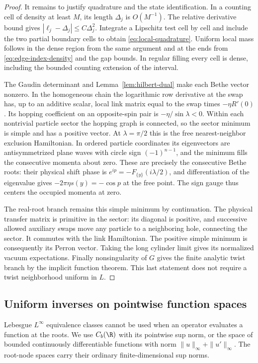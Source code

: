 \begin{proof}
It remains to justify quadrature and the state identification.
In a counting cell of density at least $M$, its length $\Delta_j$
is $O(M^{-1})$.  The relative derivative bound gives
$|\ell_j-\Delta_j|\le C\Delta_j^2$.  Integrate a Lipschitz test
cell by cell and include the two partial boundary cells to obtain
\eqref{eq:local-quadrature}.  Uniform local mass follows in the
dense region from the same argument and at the ends from
\eqref{eq:edge-index-density} and the gap bounds.  In regular
filling every cell is dense, including the bounded counting
extension of the interval.

The Gaudin determinant and Lemma~\ref{lem:hilbert-dual} make
each Bethe vector nonzero.  In the homogeneous chain the logarithmic
row derivative at the swap has, up to an additive scalar, local
link matrix equal to the swap times $-\eta R'(0)$.  Its hopping
coefficient on an opposite-spin pair is $-\eta/\sin\lambda<0$.
Within each nontrivial particle sector the hopping graph is
connected, so the sector minimum is simple and has a positive
vector.  At $\lambda=\pi/2$ this is the free nearest-neighbor
exclusion Hamiltonian.  In ordered particle coordinates its
eigenvectors are antisymmetrized plane waves with circle sign
$(-1)^{n-1}$, and the minimum fills the consecutive momenta about
zero.  These are precisely the consecutive Bethe roots: their
physical shift phase is
$e^{ip}=-F_{\{y\}}(i\lambda/2)$, and differentiation of the
eigenvalue gives $-2\pi\eta s(y)=-\cos p$ at the free point.
The sign gauge thus centers the occupied momenta at zero.

The real-root branch remains this simple minimum by continuation.
The physical transfer matrix is primitive in the sector: its
diagonal is positive, and successive allowed auxiliary swaps move
any particle to a neighboring hole, connecting the sector.
It commutes with the link Hamiltonian.  The positive simple
minimum is consequently its Perron vector.  Taking the long
cylinder limit gives its normalized vacuum expectations.
Finally nonsingularity of $G$ gives the finite analytic twist
branch by the implicit function theorem.  This last statement
does not require a twist neighborhood uniform in $L$.
\end{proof}

\subsection{Uniform inverses on pointwise function spaces}

Lebesgue $L^\infty$ equivalence classes cannot be used when an
operator evaluates a function at the roots.  We use $C_b(\R)$
with its pointwise sup norm, or the space of bounded continuously
differentiable functions with norm
$\|u\|_\infty+\|u'\|_\infty$.  The root-node spaces carry their
ordinary finite-dimensional sup norms.

